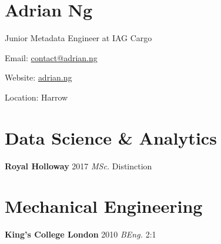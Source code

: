 \documentclass[../cv.tex]{subfiles}
\begin{document}
\section{Adrian Ng}
Junior Metadata Engineer at IAG Cargo
\hfill
\begin{description*}
	\item[Email:] \href{mailto:contact@adrian.ng}{contact@adrian.ng}
	\item[Website:] \href{https://adrian.ng}{adrian.ng}
	\item[Location:] Harrow
\end{description*}
\hfill
\vspace{0.25cm}
\noindent
\newline
\begin{minipage}[t]{0.6\linewidth}
	\begin{minipage}[t]{0.5\linewidth}
		\section{Data Science \& Analytics}
		\textbf{Royal Holloway} \hfill 2017
		\newline
		\textit{MSc.} \hfill Distinction
	\end{minipage}
	\hspace{0.2em}
	\begin{minipage}[t]{0.5\linewidth}
		\section{Mechanical Engineering}
		\textbf{King's College London} \hfill 2010
		\newline
		\textit{BEng.} \hfill 2:1
	\end{minipage}
\end{minipage}
\end{document}
